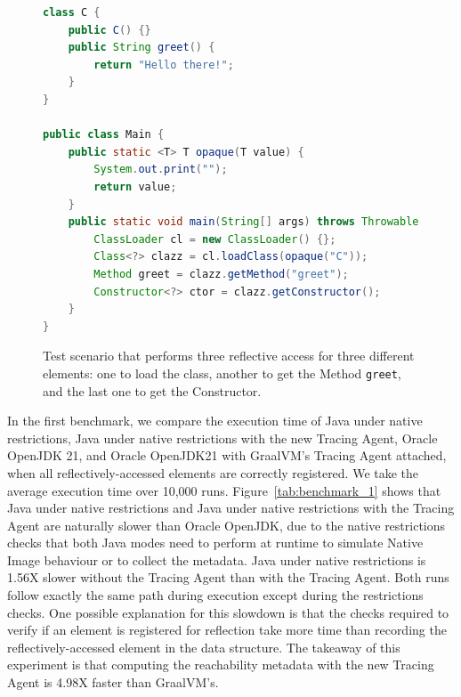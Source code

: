 \begin{figure}[ht]
    \centering
\begin{lstlisting}[language=Java]
class C {
    public C() {}
    public String greet() {
        return "Hello there!";
    }
}

public class Main {
    public static <T> T opaque(T value) {
        System.out.print("");
        return value;
    }
    public static void main(String[] args) throws Throwable {
        ClassLoader cl = new ClassLoader() {};
        Class<?> clazz = cl.loadClass(opaque("C"));
        Method greet = clazz.getMethod("greet");
        Constructor<?> ctor = clazz.getConstructor();
    }
}
\end{lstlisting}
    \caption{Test scenario that performs three reflective access for three different elements: one to load the class, another to get the Method \texttt{greet}, and the last one to get the Constructor.}
    \label{fig:benchmark}
\end{figure}

In the first benchmark, we compare the execution time of Java under native restrictions, Java under native restrictions with the new Tracing Agent, Oracle OpenJDK 21, and Oracle OpenJDK21 with GraalVM's Tracing Agent attached, when all reflectively-accessed elements are correctly registered. We take the average execution time over 10,000 runs.
Figure~\ref{tab:benchmark_1} shows that Java under native restrictions and Java under native restrictions with the Tracing Agent are naturally slower than Oracle OpenJDK, due to the native restrictions checks that both Java modes need to perform at runtime to simulate Native Image behaviour or to collect the metadata. 
Java under native restrictions is 1.56X slower without the Tracing Agent than with the Tracing Agent. Both runs follow exactly the same path during execution except during the restrictions checks. 
One possible explanation for this slowdown is that the checks required to verify if an element is registered for reflection take more time than recording the reflectively-accessed element in the data structure.  The takeaway of this experiment is that computing the reachability metadata with the new Tracing Agent is 4.98X faster than GraalVM's.

